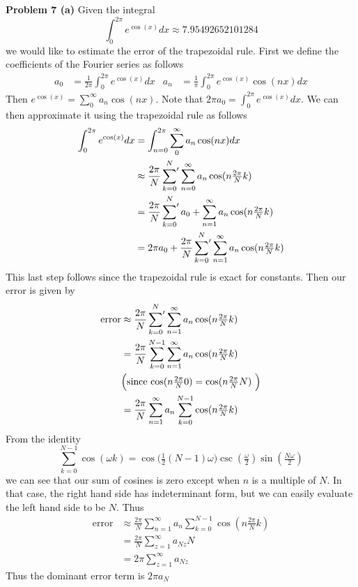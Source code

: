 \documentclass[12pt]{article}
\newcommand{\problem}[1]{\hspace{-4 ex} \large \textbf{Problem #1} }
\begin{document}
\bigbreak
\problem{7 (a)} Given the integral 
$$\int_0^{2\pi} e^{\cos(x)}dx \approx 7.95492652101284$$
we would like to estimate the error of the trapezoidal rule. First we define the coefficients of the Fourier series as follows
\begin{align*}
	a_0 & = \frac{1}{2\pi} \int_0^{2\pi} e^{\cos(x)}dx & a_n & = \frac{1}{\pi} \int_0^{2\pi} e^{\cos(x)}\cos(nx)dx
\end{align*}
Then $e^{\cos(x)} = \sum\limits_0^\infty a_n \cos(nx)$. Note that $2\pi a_0 = \int_0^{2\pi} e^{\cos(x)}dx$. We can then approximate it using the trapezoidal rule as follows
\begin{align*}
	\int_0^{2\pi} e^{\cos(x)}dx &= \int_{n=0}^{2\pi} \sum\limits_0^\infty a_n \cos(nx) dx \\
	& \approx \frac{2\pi}{N}\sideset{}{'}\sum_{k=0}^N \sum\limits_{n=0}^\infty a_n \cos(n\tfrac{2\pi}{N}k) \\
	& = \frac{2\pi}{N}\sideset{}{'}\sum_{k=0}^N a_0 + \sum\limits_{n=1}^\infty a_n \cos(n\tfrac{2\pi}{N}k) \\
	& = 2\pi a_0 + \frac{2\pi}{N}\sideset{}{'}\sum_{k=0}^N \sum\limits_{n=1}^\infty a_n \cos(n\tfrac{2\pi}{N}k) \\
\end{align*}
This last step follows since the trapezoidal rule is exact for constants. Then our error is given by
\begin{align*}
	\text{error} & \approx \frac{2\pi}{N}\sideset{}{'}\sum_{k=0}^N \sum\limits_{n=1}^\infty a_n \cos(n\tfrac{2\pi}{N}k) \\
	& = \frac{2\pi}{N} \sum_{k=0}^{N-1} \sum\limits_{n=1}^\infty a_n \cos(n\tfrac{2\pi}{N}k) \\
	& \text{\Big(since $\cos(n\tfrac{2\pi}{N}0) = \cos(n\tfrac{2\pi}{N}N)$ \Big)} \\
	& = \frac{2\pi}{N}  \sum\limits_{n=1}^\infty a_n \sum_{k=0}^{N-1} \cos(n\tfrac{2\pi}{N}k) \\
\end{align*}
From the identity
$$
\sum_{k=0}^{N-1} \cos(\omega k) = \cos \Big( \tfrac{1}{2}(N-1)\omega \Big)\csc(\tfrac{\omega}{2})\sin(\tfrac{N\omega}{2})
$$
we can see that our sum of cosines is zero except when $n$ is a multiple of $N$. In that case, the right hand side has indeterminant form, but we can easily evaluate the left hand side to be $N$. Thus
\begin{align*}
	\text{error} & \approx \frac{2\pi}{N}  \sum\limits_{n=1}^\infty a_n \sum_{k=0}^{N-1} \cos(n\tfrac{2\pi}{N}k) \\
	& = \frac{2\pi}{N}  \sum\limits_{z=1}^\infty a_{Nz} N \\
	& = 2\pi  \sum\limits_{z=1}^\infty a_{Nz}
\end{align*}
Thus the dominant error term is $2\pi a_N$
\end{document}
